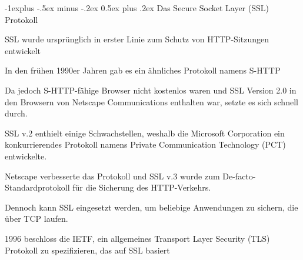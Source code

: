 \documentclass[a4paper]{article}
\makeatletter
\renewcommand{\subsection}{\@startsection{subsection}{2}{0mm}%
 {-1explus -.5ex minus -.2ex}%
 {0.5ex plus .2ex}%
 {\normalfont\normalsize\bfseries}}
\makeatother
\begin{document}
\begin{multicols}{3}
      \subsection{Das Secure Socket Layer (SSL) Protokoll}
      \begin{itemize*}
            \item SSL wurde ursprünglich in erster Linie zum Schutz von HTTP-Sitzungen entwickelt
            \item In den frühen 1990er Jahren gab es ein ähnliches Protokoll namens S-HTTP
            \item Da jedoch S-HTTP-fähige Browser nicht kostenlos waren und SSL Version 2.0 in den Browsern von Netscape Communications enthalten war, setzte es sich schnell durch.
            \item SSL v.2 enthielt einige Schwachstellen, weshalb die Microsoft Corporation ein konkurrierendes Protokoll namens Private Communication Technology (PCT) entwickelte.
            \item Netscape verbesserte das Protokoll und SSL v.3 wurde zum De-facto-Standardprotokoll für die Sicherung des HTTP-Verkehrs.
            \item Dennoch kann SSL eingesetzt werden, um beliebige Anwendungen zu sichern, die über TCP laufen.
            \item 1996 beschloss die IETF, ein allgemeines Transport Layer Security (TLS) Protokoll zu spezifizieren, das auf SSL basiert
      \end{itemize*}


\end{multicols}
\end{document}
